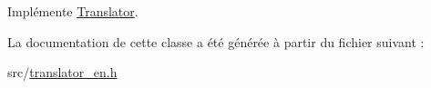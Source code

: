 Implémente \hyperlink{class_translator_a31e719b4e290a359ddbb78132bf3f494}{Translator}.



La documentation de cette classe a été générée à partir du fichier suivant \+:\begin{DoxyCompactItemize}
\item 
src/\hyperlink{translator__en_8h}{translator\+\_\+en.\+h}\end{DoxyCompactItemize}
